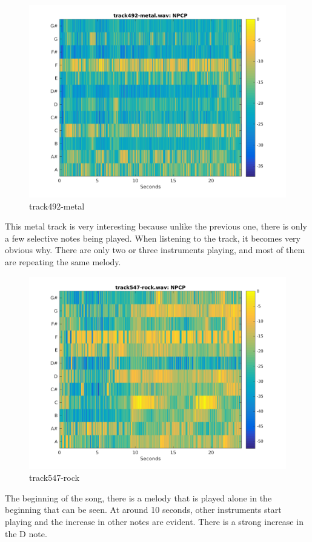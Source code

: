 \documentclass[11pt, a4paper]{article}
\begin{document}
\begin{figure}[H]
    \centering
    \includegraphics[width=.8\textwidth]{track492-metal-NPCP.png}
    \caption{track492-metal}
\end{figure}


This metal track is very interesting because unlike the previous one, there is only a few selective notes being played. When listening to the track, it becomes very obvious why. There are only two or three instruments playing, and most of them are repeating the same melody.


\begin{figure}[H]
    \centering
    \includegraphics[width=.8\textwidth]{track547-rock-NPCP.png}
    \caption{track547-rock}
\end{figure}


The beginning of the song, there is a melody that is played alone in the beginning that can be seen. At around 10 seconds, other instruments start playing and the increase in other notes are evident. There is a strong increase in the D note.
\end{document}
